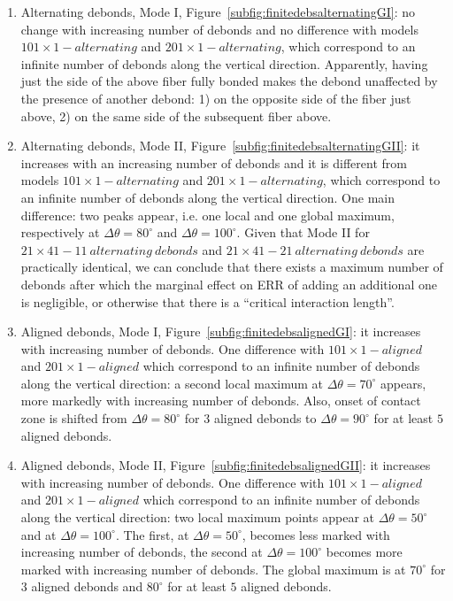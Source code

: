 \documentclass[smallextended]{svjour3}       %
\begin{document}
\begin{enumerate}
\item Alternating debonds, Mode I, Figure~\ref{subfig:finitedebsalternatingGI}: no change with increasing number of debonds and no difference with models $101\times1-alternating$ and $201\times1-alternating$, which correspond to an infinite number of debonds along the vertical direction. Apparently, having just the side of the above fiber fully bonded makes the debond unaffected by the presence of another debond: 1) on the opposite side of the fiber just above, 2) on the same side of the subsequent fiber above.
\item Alternating debonds, Mode II, Figure~\ref{subfig:finitedebsalternatingGII}: it increases with an increasing number of debonds and it is different from models $101\times1-alternating$ and $201\times1-alternating$, which correspond to an infinite number of debonds along the vertical direction. One main difference: two peaks appear, i.e. one local and one global maximum, respectively at $\Delta\theta=80^{\circ}$ and $\Delta\theta=100^{\circ}$. Given that Mode II for $21\times41-11\ alternating\ debonds$ and $21\times41-21\ alternating\ debonds$ are practically identical, we can conclude that there exists a maximum number of debonds after which the marginal effect on ERR of adding an additional one is negligible, or otherwise that there is a ``critical interaction length''.
\item Aligned debonds, Mode I, Figure~\ref{subfig:finitedebsalignedGI}: it increases with increasing number of debonds. One difference with $101\times1-aligned$ and $201\times1-aligned$ which correspond to an infinite number of debonds along the vertical direction: a second local maximum at $\Delta\theta=70^{\circ}$ appears, more markedly with increasing number of debonds. Also, onset of contact zone is shifted from $\Delta\theta=80^{\circ}$ for $3$ aligned debonds to $\Delta\theta=90^{\circ}$ for at least $5$ aligned debonds.
\item Aligned debonds, Mode II, Figure~\ref{subfig:finitedebsalignedGII}: it increases with increasing number of debonds. One difference with $101\times1-aligned$ and $201\times1-aligned$ which correspond to an infinite number of debonds along the vertical direction: two local maximum points appear at $\Delta\theta=50^{\circ}$ and at $\Delta\theta=100^{\circ}$. The first, at $\Delta\theta=50^{\circ}$, becomes less marked with increasing number of debonds, the second at $\Delta\theta=100^{\circ}$ becomes more marked with increasing number of debonds. The global maximum is at $70^{\circ}$ for $3$ aligned debonds and $80^{\circ}$  for at least $5$ aligned debonds.

\end{enumerate}
\end{document}
